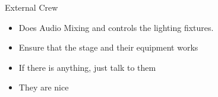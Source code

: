 
\begin{frame}{External Crew}
	\begin{itemize}
		\item Does Audio Mixing and controls the lighting fixtures.
		\item Ensure that the stage and their equipment works
		\item If there is anything, just talk to them
		\item They are nice
	\end{itemize}
\end{frame}
